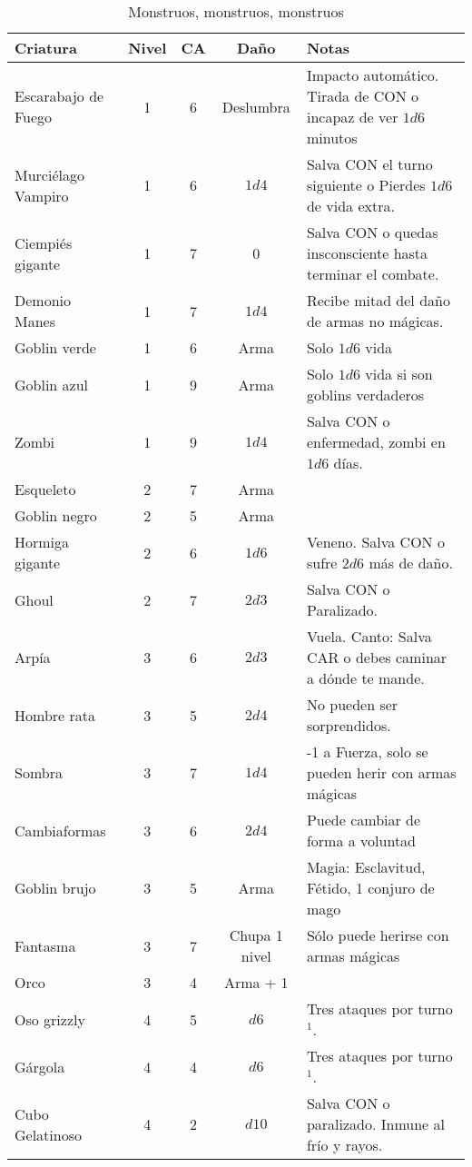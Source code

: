 \begin{multicols}{2}
\begin{table*}[p]
\caption{Monstruos, monstruos, monstruos}
\label{c:monstruos}
\centering
\begin{threeparttable}
\begin{tabular}{lcccp{8cm}}
\toprule
Criatura             & Nivel &   CA & Daño & Notas\\
\midrule
Escarabajo de Fuego  &  1 &  6  & Deslumbra &  Impacto automático. Tirada de CON o incapaz de ver $ 1d6$ minutos\\
Murciélago Vampiro   & 1 & 6 & $ 1d4$ & Salva CON el turno siguiente o Pierdes $ 1d6$ de vida extra.\\
Ciempiés gigante    & 1 & 7 & 0 & Salva CON o quedas insconsciente hasta terminar el combate.\\
Demonio Manes       & 1 & 7 & $ 1d4$ & Recibe mitad del daño de armas no mágicas. \\
Goblin verde & 1 & 6 & Arma & Solo $ 1d6$ vida\\
Goblin azul & 1 & 9 & Arma & Solo $ 1d6$ vida si son goblins verdaderos\\
Zombi & 1 & 9 & $ 1d4$ & Salva CON o enfermedad, zombi en $ 1d6$ días.\\
\midrule
Esqueleto & 2 & 7 & Arma & \\
Goblin negro & 2 & 5 & Arma & \\
Hormiga gigante & 2 & 6 & $ 1d6$ & Veneno. Salva CON o sufre $ 2d6$ más de daño.\\
Ghoul & 2 & 7 & $ 2d3$ & Salva CON o Paralizado.\\
\midrule
Arpía & 3 & 6 & $ 2d3$ & Vuela. Canto: Salva CAR o debes caminar a dónde te mande.\\
Hombre rata & 3 & 5 & $ 2d4$ & No pueden ser sorprendidos. \\
Sombra & 3 & 7 & $ 1d4$ & -1 a Fuerza, solo se pueden herir con armas mágicas\\
Cambiaformas & 3 & 6 & $ 2d4$ & Puede cambiar de forma a voluntad\\
Goblin brujo & 3 & 5 & Arma & Magia: Esclavitud, Fétido, 1 conjuro de mago\\
Fantasma & 3 & 7 & Chupa 1 nivel & Sólo puede herirse con armas mágicas\\
Orco & 3 & 4 & Arma + 1 & \\
\midrule
Oso grizzly & 4 & 5 & $d6$ & Tres ataques por turno$^1$.\\
Gárgola & 4 & 4 &$  d6$ & Tres ataques por turno$^1$.\\
Cubo Gelatinoso & 4 & 2 &$  d10$ & Salva CON o paralizado. Inmune al frío y rayos.\\

\end{tabular}
\end{threeparttable}
\end{table*}
\end{multicols}
